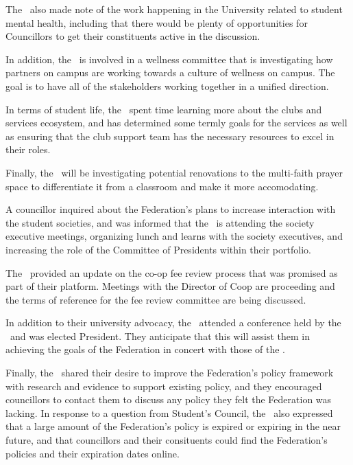 \documentclass[12pt, letterpaper]{article}
\begin{document}
\begin{information}

    The \vpi\ also made note of the work happening in the University related
    to student mental health, including that there would be plenty of 
    opportunities for Councillors to get their constituents active in the 
    discussion. 
    
    In addition, the \vpi\ is involved in a wellness committee that is 
    investigating how partners on campus are working towards a culture of 
    wellness on campus. The goal is to have all of the stakeholders working
    together in a unified direction. 
    
    In terms of student life,  the \vpi\ spent time learning more about the 
    clubs and services ecosystem, and has determined some termly goals for the 
    services as well as ensuring that the club support team has the 
    necessary resources to excel in their roles. 

    Finally, the \vpi\ will be investigating potential renovations to 
    the multi-faith prayer space to differentiate it from a classroom 
    and make it more accomodating.

    A councillor inquired about the Federation's plans to increase interaction
    with the student societies, and was informed that the \vpi\ is attending 
    the society executive meetings, organizing lunch and learns with the
    society executives, and increasing the role of the Committee of Presidents
    within their portfolio. 
    
\end{information}

\begin{information}

    The \vpe\ provided an update on the co-op fee review process that
    was promised as part of their platform. Meetings with the Director of Coop
    are proceeding and the terms of reference for the fee review committee are 
    being discussed.

    In addition to their university advocacy, the \vpe\ attended a conference 
    held by the \ousa\ and was elected President. They anticipate that this 
    will assist them in achieving the goals of the Federation in concert with 
    those of the \ousa.

    Finally, the \vpe\ shared their desire to improve the Federation's policy 
    framework with research and evidence to support existing policy, and
    they encouraged councillors to contact them to discuss any policy
    they felt the Federation was lacking. In response to a question from 
    Student's Council, the \vpe\ also expressed that a large amount of the 
    Federation's policy is expired or expiring in the near future, and that
    councillors and their consituents could find the Federation's policies
    and their expiration dates online.

\end{information}
\end{document}
